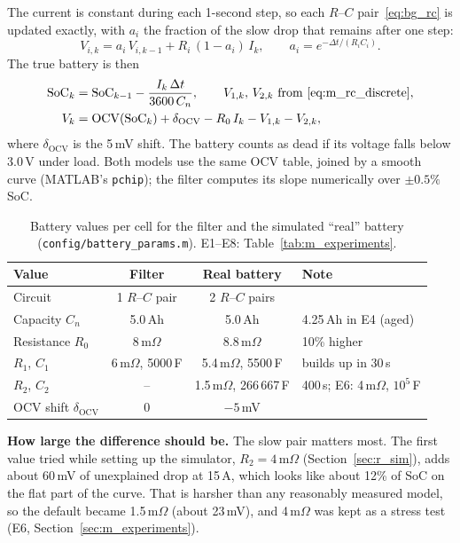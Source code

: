 \label{sec:m_rc_discrete}\label{sec:m_truth}The current is constant during each 1-second step, so each $R$--$C$ pair~\eqref{eq:bg_rc} is updated exactly, with $a_i$ the fraction of the slow drop that remains after one step:
\begin{equation}
  V_{i,k} = a_i\, V_{i,k-1} + R_i\,(1 - a_i)\, I_k, \qquad a_i = e^{-\Delta t / (R_i C_i)} .
  \label{eq:m_rc_discrete}
\end{equation}
The true battery is then
\begin{align}
  \mathrm{SoC}_k &= \mathrm{SoC}_{k-1} - \frac{I_k\, \Delta t}{3600\, C_n}, \qquad V_{1,k},\, V_{2,k} \text{ from \eqref{eq:m_rc_discrete}}, \label{eq:m_true_soc}\\
  V_k &= \mathrm{OCV}(\mathrm{SoC}_k) + \delta_{\text{OCV}} - R_0\, I_k - V_{1,k} - V_{2,k}, \label{eq:m_true_v}
\end{align}
where $\delta_{\text{OCV}}$ is the 5\,mV shift. The battery counts as dead if its voltage falls below 3.0\,V under load. \label{sec:m_ocv}\label{eq:m_ocv_slope}Both models use the same OCV table, joined by a smooth curve (MATLAB's \texttt{pchip}); the filter computes its slope numerically over $\pm 0.5\%$ SoC.

\begin{table}[htbp]
  \centering
  \caption{Battery values per cell for the filter and the simulated ``real'' battery (\texttt{config/battery\_params.m}). E1--E8: Table~\ref{tab:m_experiments}.}
  \label{tab:m_params}
  \small
  \begin{tabular}{@{}lccl@{}}
    \toprule
    Value & Filter & Real battery & Note \\
    \midrule
    Circuit & 1 $R$--$C$ pair & 2 $R$--$C$ pairs & \\
    Capacity $C_n$ & 5.0\,Ah & 5.0\,Ah & 4.25\,Ah in E4 (aged) \\
    Resistance $R_0$ & 8\,m$\Omega$ & 8.8\,m$\Omega$ & 10\% higher \\
    $R_1$, $C_1$ & 6\,m$\Omega$, 5000\,F & 5.4\,m$\Omega$, 5500\,F & builds up in 30\,s \\
    $R_2$, $C_2$ & -- & 1.5\,m$\Omega$, 266\,667\,F & 400\,s; E6: 4\,m$\Omega$, $10^5$\,F \\
    OCV shift $\delta_{\text{OCV}}$ & 0 & $-5$\,mV & \\
    \bottomrule
  \end{tabular}
\end{table}

\label{sec:m_params}\label{sec:m_why_mismatch}\textbf{How large the difference should be.} The slow pair matters most. The first value tried while setting up the simulator, $R_2 = 4$\,m$\Omega$ (Section~\ref{sec:r_sim}), adds about 60\,mV of unexplained drop at 15\,A, which looks like about 12\% of SoC on the flat part of the curve. That is harsher than any reasonably measured model, so the default became 1.5\,m$\Omega$ (about 23\,mV), and 4\,m$\Omega$ was kept as a stress test (E6, Section~\ref{sec:m_experiments}).

